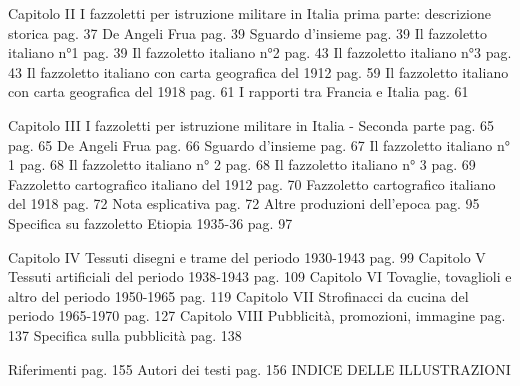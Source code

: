 Capitolo II
I fazzoletti per istruzione militare in Italia 
prima parte: descrizione storica                                  pag.  37                                                        
  De Angeli Frua                                      		         pag.  39
Sguardo d’insieme     			  	          pag. 39
Il fazzoletto italiano n°1	                   		          pag. 39
Il fazzoletto italiano n°2                           		          pag. 43
Il fazzoletto italiano n°3	                      		          pag. 43
Il fazzoletto italiano con carta geografica del 1912         pag. 59
Il fazzoletto italiano con carta geografica del 1918         pag. 61
I rapporti tra Francia e Italia	                    		          pag. 61

Capitolo III
I fazzoletti per istruzione militare in Italia - Seconda parte                                                                                           pag. 65                                                                            pag.   65                           
De Angeli Frua			               	          pag. 66
Sguardo d’insieme			         		         pag.  67
Il fazzoletto italiano n° 1                              	         pag.  68 
Il fazzoletto italiano n° 2                               	         pag.  68
Il fazzoletto italiano n° 3                              	         pag.  69
Fazzoletto cartografico italiano del 1912      	         pag.  70
Fazzoletto cartografico italiano del 1918       	          pag. 72
Nota esplicativa                                             	         pag.  72
Altre produzioni dell’epoca                          	         pag.  95
Specifica su fazzoletto Etiopia 1935-36 		         pag.  97

Capitolo IV 
Tessuti disegni e trame del periodo 1930-1943               pag. 99
Capitolo V
Tessuti artificiali del periodo 1938-1943             	        pag. 109
Capitolo VI
Tovaglie, tovaglioli e altro del periodo 1950-1965        pag. 119    
Capitolo VII
Strofinacci da cucina  del periodo  1965-1970               pag. 127                                             
Capitolo VIII
Pubblicità, promozioni, immagine 		 	        pag. 137
Specifica sulla pubblicità  				       pag.  138

Riferimenti		           			        pag. 155
Autori dei testi				                    pag. 156
INDICE DELLE ILLUSTRAZIONI

